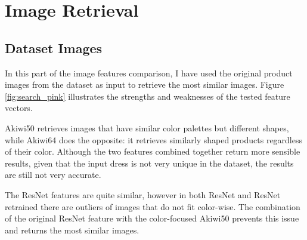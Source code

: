 \documentclass[12pt]{report}
\begin{document}
\pagebreak
\section{Image Retrieval}

\subsection{Dataset Images}
In this part of the image features comparison, I have used the original product images from the dataset as input to retrieve the most similar images. Figure \ref{fig:search_pink} illustrates the strengths and weaknesses of the tested feature vectors. 

Akiwi50 retrieves images that have similar color palettes but different shapes, while Akiwi64 does the opposite: it retrieves similarly shaped products regardless of their color. Although the two features combined together return more sensible results, given that the input dress is not very unique in the dataset, the results are still not very accurate. 

The ResNet features are quite similar, however in both ResNet and ResNet retrained there are outliers of images that do not fit color-wise. The combination of the original ResNet feature with the color-focused Akiwi50 prevents this issue and returns the most similar images. 
\end{document}
